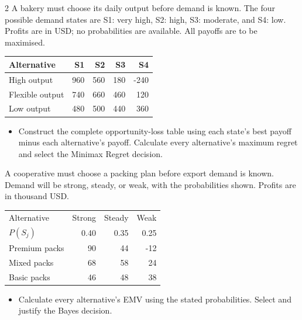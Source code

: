 \begin{multicols}{2}
A bakery must choose its daily output before demand is known. The four possible demand states are S1: very high, S2: high, S3: moderate, and S4: low. Profits are in USD; no probabilities are available. All payoffs are to be maximised.
\begin{center}\small\setlength{\tabcolsep}{4pt}
\begin{tabular}{@{}lrrrr@{}}\toprule
Alternative&S1&S2&S3&S4\\\midrule
High output&960&560&180&-240\\
Flexible output&740&660&460&120\\
Low output&480&500&440&360\\\bottomrule
\end{tabular}\end{center}
\begin{itemize}\item[\textbf{(C5)}] Construct the complete opportunity-loss table using each state's best payoff minus each alternative's payoff. Calculate every alternative's maximum regret and select the Minimax Regret decision. \end{itemize}
\columnbreak
{}
A cooperative must choose a packing plan before export demand is known. Demand will be strong, steady, or weak, with the probabilities shown. Profits are in thousand USD.
\begin{center}\small\setlength{\tabcolsep}{4pt}
\begin{tabular}{@{}lrrr@{}}\toprule
Alternative&Strong&Steady&Weak\\
$P(S_j)$&0.40&0.35&0.25\\\midrule
Premium packs&90&44&-12\\
Mixed packs&68&58&24\\
Basic packs&46&48&38\\\bottomrule
\end{tabular}\end{center}
\begin{itemize}\item[\textbf{(C6)}] Calculate every alternative's EMV using the stated probabilities. Select and justify the Bayes decision. \end{itemize}


\end{multicols}

